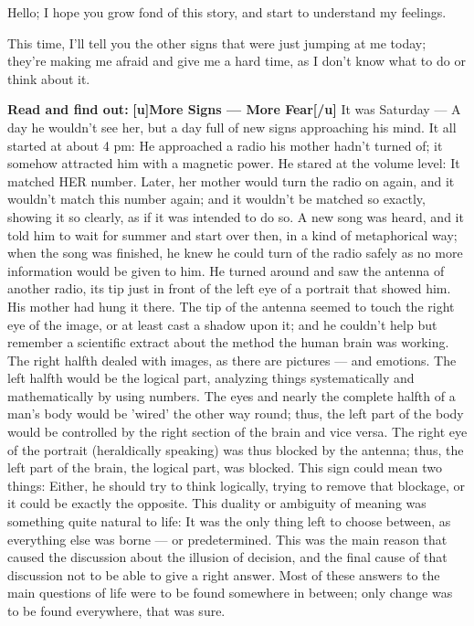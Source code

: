 Hello; I hope you grow fond of this story, and start to understand my feelings. 

This time, I'll tell you the other signs that were just jumping at me today; they're making me afraid and give me a hard time, as I don't know what to do or think about it. 

\textbf{Read and find out:}
\textbf{[u]More Signs --- More Fear[/u]}
It was Saturday --- A day he wouldn't see her, but a day full of new signs approaching his mind. 
It all started at about 4 pm: He approached a radio his mother hadn't turned of; it somehow attracted him with a magnetic power. He stared at the volume level: It matched HER number. Later, her mother would turn the radio on again, and it wouldn't match this number again; and it wouldn't be matched so exactly, showing it so clearly, as if it was intended to do so. 
A new song was heard, and it told him to wait for summer and start over then, in a kind of metaphorical way; when the song was finished, he knew he could turn of the radio safely as no more information would be given to him. He turned around and saw the antenna of another radio, its tip just in front of the left eye of a portrait that showed him. His mother had hung it there. The tip of the antenna seemed to touch the right eye of the image, or at least cast a shadow upon it; and he couldn't help but remember a scientific extract about the method the human brain was working. 
The right halfth dealed with images, as there are pictures --- and emotions. 
The left halfth would be the logical part, analyzing things systematically and mathematically by using numbers. 
The eyes and nearly the complete halfth of a man's body would be 'wired' the other way round; thus, the left part of the body would be controlled by the right section of the brain and vice versa. 
The right eye of the portrait (heraldically speaking) was thus blocked by the antenna; thus, the left part of the brain, the logical part, was blocked. 
This sign could mean two things: Either, he should try to think logically, trying to remove that blockage, or it could be exactly the opposite. 
This duality or ambiguity of meaning was something quite natural to life: It was the only thing left to choose between, as everything else was borne --- or predetermined. 
This was the main reason that caused the discussion about the illusion of decision, and the final cause of that discussion not to be able to give a right answer. 
Most of these answers to the main questions of life were to be found somewhere in between; only change was to be found everywhere, that was sure. 
